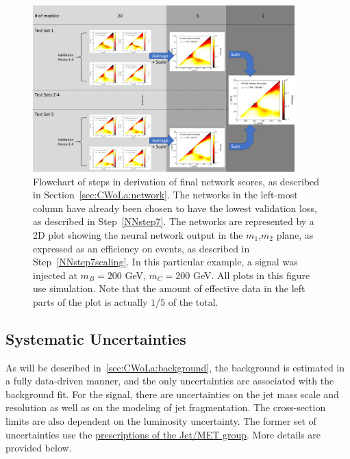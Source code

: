\begin{figure}[t!]
    \centering
    \includegraphics[width=0.9\textwidth]{figures_CWoLa/split_flowchart.pdf}
    \caption{Flowchart of steps in derivation of final network scores, as described in Section~\ref{sec:CWoLa:network}. The networks in the left-most column have already been chosen to have the lowest validation loss, as described in Step~\ref{NNstep7}. The networks are represented by a 2D plot showing the neural network output in the $m_1$,$m_2$ plane, as expressed as an efficiency on events, as described in Step~\ref{NNstep7scaling}. In this particular example, a signal was injected at $m_B=200$ GeV, $m_C=200$ GeV.  All plots in this figure use simulation.  Note that the amount of effective data in the left parts of the plot is actually $1/5$ of the total.}
    \label{fig:CWoLa:flowchart}
\end{figure}


\subsection{Systematic Uncertainties}
\label{sec:CWoLa:systs}

As will be described in~\ref{sec:CWoLa:background}, the background is estimated in a fully data-driven manner, and the only uncertainties are associated with the background fit.
For the signal, there are uncertainties on the jet mass scale and resolution as well as on the modeling of jet fragmentation.
The cross-section limits are also dependent on the luminosity uncertainty.
The former set of uncertainties use the \href{https://twiki.cern.ch/twiki/bin/view/AtlasProtected/JetUncertaintiesRel21Summer2019LargeR}{prescriptions of the Jet/MET group}.  More details are provided below.

